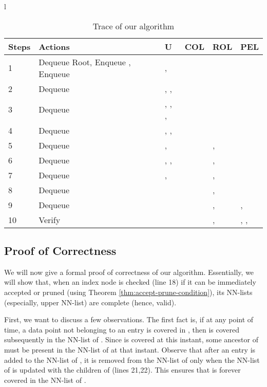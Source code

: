 \documentclass[prodmode,letterpaper]{acmsmall}
\begin{document}
\begin{table}[tp]
\begin{tabular}{l}
\begin{minipage}[t]{\linewidth}
\begin{center}
\caption{Trace of our algorithm \label{Tab:our_algo}}
    \begin{tabular}{ |l| p{4cm} | l | l | l | p{2cm} |}
    \hline
    \bfseries{Steps} & \bfseries{Actions} & \bfseries{U}& \textbf{COL} & \textbf{ROL} & \textbf{PEL} \\ \hline
    1 & Dequeue Root, Enqueue , Enqueue  & ,  &&&\\ \hline
	2 & Dequeue  & , ,  & &&\\ \hline
	3 & Dequeue  & , , ,  && &  \\ \hline
	4 & Dequeue & , ,  &&& \\ \hline
	5 & Dequeue & ,  &&, & \\ \hline
	6 & Dequeue & , ,  &&, & \\ \hline
	7 & Dequeue & ,  &&, & \\ \hline
    8 & Dequeue &  &&, & \\ \hline
    9 & Dequeue &  &&, & , \\ \hline
    10 & Verify &  &&, & , , \\ \hline
    \end{tabular}
\end{center}
\end{minipage}
 \end{tabular}
\end{table} 

 
\subsection{Proof of Correctness}\label{section:proof}
We will now give a formal proof of correctness of our algorithm. Essentially, we
will show that, when an index node is checked (line 18) if it can be immediately accepted
or pruned (using Theorem \ref{thm:accept-prune-condition}),
its NN-lists (especially, upper NN-list) are complete (hence, valid).

First, we want to discuss a few observations. The first fact is, if at
any point of time, a
data point  not belonging to an entry  is covered in , then
 is covered subsequently in the NN-list of .
Since  is covered at this instant, some ancestor  of  must be present in
the NN-list of  at that instant. Observe that after an entry is added to the NN-list of ,
it is removed from the  NN-list of  only when the NN-list of  is updated
with the children of  (lines 21,22). This ensures that  is forever covered in the
NN-list of .
\end{document}
